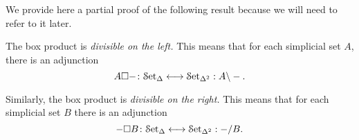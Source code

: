 \documentclass[main.tex]{subfiles}
\begin{document}
We provide here a partial proof of the following result because we will need to refer to it later.
\begin{proposition}
  \label{prop:bijection_exhibiting_box_divisibility}
  The box product is \emph{divisible on the left.} This means that for each simplicial set $A$, there is an adjunction
  \begin{equation*}
    A \square -\colon \mathcal{S}\mathrm{et}_{\Delta} \longleftrightarrow \mathcal{S}\mathrm{et}_{\Delta^{2}} : A \backslash -.
  \end{equation*}

  Similarly, the box product is \emph{divisible on the right.} This means that for each simplicial set $B$ there is an adjunction
  \begin{equation*}
    - \square B\colon \mathcal{S}\mathrm{et}_{\Delta} \longleftrightarrow \mathcal{S}\mathrm{et}_{\Delta^{2}} : - / B.
  \end{equation*}
\end{proposition}
\end{document}
